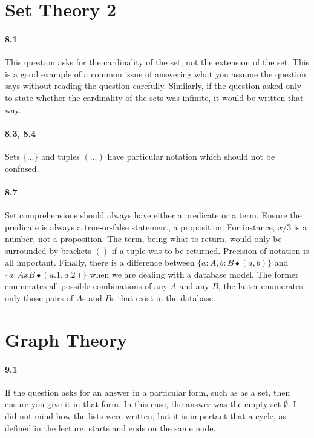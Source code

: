 \documentclass{article}
\begin{document}
\section{Set Theory 2}

\paragraph{8.1} This question asks for the cardinality of the set, not the extension of the set. This is a good example of a common issue of answering what you assume the question says without reading the question carefully. Similarly, if the question asked only to state whether the cardinality of the sets was infinite, it would be written that way. 

\paragraph{8.3, 8.4} Sets $\{ ... \}$ and tuples $( ... )$ have particular notation which should not be confused. 

\paragraph{8.7} Set comprehensions should always have either a predicate or a term. Ensure the predicate is always a true-or-false statement, a proposition. For instance, $x/3$ is a number, not a proposition. The term, being what to return, would only be surrounded by brackets $( )$ if a tuple was to be returned. Precision of notation is all important. Finally, there is a difference between $\{a: A, b: B \bullet (a, b) \}$ and $\{a: A x B \bullet (a.1, a.2) \}$ when we are dealing with a database model. The former enumerates all possible combinations of any $A$ and any $B$, the latter enumerates only those pairs of $A$s and $B$s that exist in the database. 

\section{Graph Theory}

\paragraph{9.1} If the question asks for an answer in a particular form, such as as a set, then ensure you give it in that form. In this case, the answer was the empty set $\emptyset$. I did not mind how the lists were written, but it is important that a cycle, as defined in the lecture, starts and ends on the same node.
\end{document}
